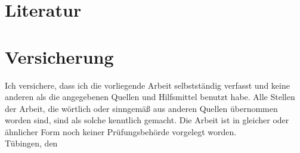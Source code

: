\documentclass[12pt,oneside,a4paper]{scrreprt}
\begin{document}
\section{Literatur}
\printbibliography[keyword=Quelle,heading=quelle] 
\printbibliography[keyword=Kommentar,heading=kommentar]
\printbibliography[keyword=Lexikon,heading=lexikon]
\printbibliography[notkeyword=Quelle,notkeyword=Lexikon,notkeyword=Kommentar,heading=lit] 


\newpage
\section{Versicherung}
\normalsize
\noindent Ich versichere, dass ich die vorliegende Arbeit selbstständig verfasst und keine anderen als die angegebenen Quellen und Hilfsmittel benutzt habe. Alle Stellen der Arbeit, die wörtlich oder sinngemäß aus anderen Quellen übernommen worden sind, sind als solche kenntlich gemacht. Die Arbeit ist in gleicher oder ähnlicher Form noch keiner Prüfungsbehörde vorgelegt worden.\\%

\noindent
Tübingen, den \date \\[4ex]

\noindent \MyAuthor
\end{document}
